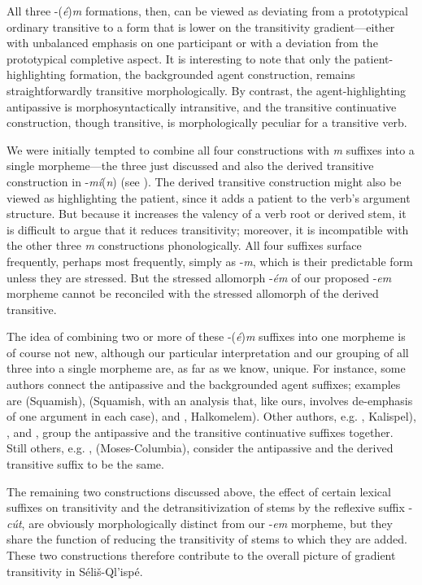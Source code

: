 \documentclass[output=paper,colorlinks,citecolor=brown]{langscibook}
\begin{document}
All three -(\emph{\'e})\emph{m}  formations, then, can be viewed as
 deviating from a prototypical ordinary transitive to a form that is
 lower on the transitivity gradient---either with unbalanced emphasis
 on one participant or with a deviation from the prototypical
 completive aspect.  It is interesting to note that only the
 patient-highlighting formation, the backgrounded agent construction,
 remains straightforwardly transitive morphologically.  By contrast,
 the agent-highlighting antipassive is morphosyntactically
 intransitive, and the transitive continuative construction, though
 transitive, is morphologically peculiar for a transitive verb.


We were initially tempted to combine all four constructions with
\emph{m} suffixes into a single morpheme---the three just discussed
and also the derived transitive construction in -\emph{m\'i}(\emph{n})
(see \cite{S.Thomason&Everett:1993}).  The derived transitive
construction might also be viewed as highlighting the patient, since
it adds a patient to the verb's argument structure.  But because it
increases the valency of a verb root or derived stem, it is difficult
to argue that it reduces transitivity; moreover, it is incompatible
with the other three \emph{m} constructions phonologically.  All four
suffixes surface frequently, perhaps most frequently, simply as
-\emph{m}, which is their predictable form unless they are stressed.
But the stressed allomorph -\emph{\'em} of our proposed -\emph{em}
morpheme cannot be reconciled with the stressed allomorph of the
derived transitive.

The idea of combining two or more of these -(\emph{\'e})\emph{m}
 suffixes into one morpheme is of course not new, although our
 particular interpretation and our grouping of all three into a
 single morpheme are, as far as we know, unique.  For instance, some
 authors connect the antipassive and the backgrounded agent suffixes;
 examples are \cite{Kuipers:1967} (Squamish), \cite{Darnell:1990}
 (Squamish, with an analysis that, like ours, involves de-emphasis of
 one argument in each case), and \cite[185]{Gerdts:1989},
 Halkomelem).  Other authors, e.g. \cite[32]{Vogt:1940},
 Kalispel), \cite[158--59]{Newman:1980}, and
 \cite[294]{Kroeber:1991}, group the antipassive and the
 transitive continuative suffixes together.  Still others,
 e.g. \cite[105]{Kinkade:1981}, (Moses-Columbia), consider the
 antipassive and the derived transitive suffix to be the same.

The remaining two constructions discussed above, the effect of certain
lexical suffixes on transitivity and the detransitivization of stems
by the reflexive suffix -\emph{c\'ut}, are obviously morphologically
distinct from our -\emph{em} morpheme, but they share the function of
reducing the transitivity of stems to which they are added.  These two
constructions therefore contribute to the overall picture of gradient
transitivity in S\'eli\v{s}-Ql'isp\'e.
\end{document}
